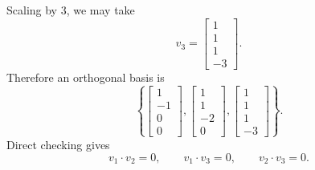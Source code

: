 \documentclass[12pt]{article}
\begin{document}
\begin{enumerate}[label=(\alph*)]
\[  \]
  Scaling by $3$, we may take
  \[
  v_3=\begin{bmatrix}1\\1\\1\\-3\end{bmatrix}.
  \]
  Therefore an orthogonal basis is
  \[
  \boxed{
  \left\{
  \begin{bmatrix}1\\-1\\0\\0\end{bmatrix},
  \begin{bmatrix}1\\1\\-2\\0\end{bmatrix},
  \begin{bmatrix}1\\1\\1\\-3\end{bmatrix}
  \right\}.}
  \]
  Direct checking gives
  \[
  v_1\cdot v_2=0,
  \qquad
  v_1\cdot v_3=0,
  \qquad
  v_2\cdot v_3=0.
  \]


\end{enumerate}
\end{document}
